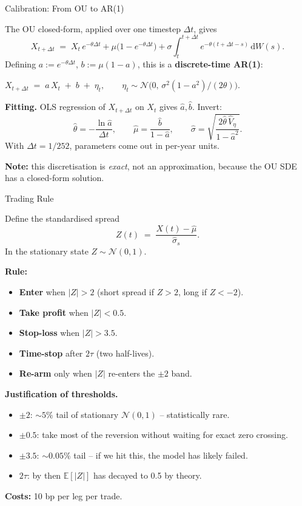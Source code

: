 \documentclass[10pt,aspectratio=169]{beamer}
\newcommand{\dd}{\mathrm{d}}
\newcommand{\E}{\mathbb{E}}
\newcommand{\N}{\mathcal{N}}
\begin{document}
\begin{frame}{Calibration: From OU to AR(1)}

The OU closed-form, applied over one timestep $\Delta t$, gives
\[
X_{t+\Delta t} \;=\; X_t\,e^{-\theta\Delta t} + \mu\bigl(1-e^{-\theta\Delta t}\bigr)
+ \sigma\!\int_t^{t+\Delta t}\! e^{-\theta(t+\Delta t - s)}\,\dd W(s).
\]
Defining $a := e^{-\theta\Delta t}$, $b := \mu(1-a)$, this is a
\textbf{discrete-time AR(1)}:
\begin{block}{}
\centering
$X_{t+\Delta t} \;=\; a\,X_t \;+\; b \;+\; \eta_t,
\qquad \eta_t \sim \N\!\bigl(0,\,\sigma^2(1-a^2)/(2\theta)\bigr).$
\end{block}

\medskip
\textbf{Fitting.} OLS regression of $X_{t+\Delta t}$ on $X_t$ gives
$\hat a, \hat b$. Invert:
\[
\hat\theta = -\frac{\ln \hat a}{\Delta t}, \qquad
\hat\mu    = \frac{\hat b}{1-\hat a}, \qquad
\hat\sigma = \sqrt{\frac{2\hat\theta\,\hat V_\eta}{1-\hat a^2}}.
\]
With $\Delta t = 1/252$, parameters come out in per-year units.

\medskip
\textbf{Note:} this discretisation is \emph{exact}, not an approximation,
because the OU SDE has a closed-form solution.

\end{frame}

\begin{frame}{Trading Rule}

Define the standardised spread
\[
Z(t) \;=\; \frac{X(t) - \hat\mu}{\hat\sigma_s}.
\]
In the stationary state $Z \sim \N(0,1)$.

\bigskip
\textbf{Rule:}
\begin{itemize}\itemsep1pt
  \item \textbf{Enter} when $|Z| > 2$ (short spread if $Z>2$, long if $Z<-2$).
  \item \textbf{Take profit} when $|Z| < 0.5$.
  \item \textbf{Stop-loss} when $|Z| > 3.5$.
  \item \textbf{Time-stop} after $2\tau$ (two half-lives).
  \item \textbf{Re-arm} only when $|Z|$ re-enters the $\pm 2$ band.
\end{itemize}

\smallskip
\textbf{Justification of thresholds.}
\begin{itemize}\itemsep1pt
  \item $\pm 2$: $\sim 5\%$ tail of stationary $\N(0,1)$ -- statistically rare.
  \item $\pm 0.5$: take most of the reversion without waiting for exact zero crossing.
  \item $\pm 3.5$: $\sim 0.05\%$ tail -- if we hit this, the model has likely failed.
  \item $2\tau$: by then $\E[|Z|]$ has decayed to 0.5 by theory.
\end{itemize}

\smallskip
\textbf{Costs:} 10 bp per leg per trade.

\end{frame}
\end{document}
